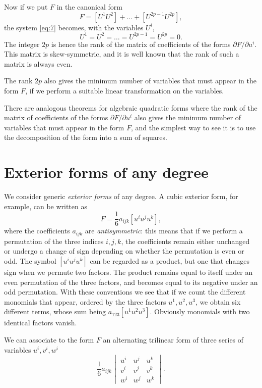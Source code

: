 \documentclass[leqno,11pt]{book}
\numberwithin{equation}{chapter}
\newcommand{\pd}{\partial}
\theoremstyle{shape1}
\theoremstyle{shape0}
\theoremstyle{shape2}
\theoremstyle{definition}
\begin{document}
Now if we put $F$ in the canonical form
\[
F=[U^{1}U^{2}]+\dots+[U^{2p-1}U^{2p}],
\]
the system \eqref{eq:7} becomes, with the variables $U^{i}$,
\[
U^{1}=U^{2}=\dots=U^{2p-1}=U^{2p}=0.
\]
The integer $2p$ is hence the rank of the matrix of coefficients of the forms $\pd F/\pd u^{i}$. This matrix is skew-symmetric, and it is well known that the rank of such a matrix is always even.

The rank $2p$ also gives the minimum number of variables that must appear in the form $F$, if we perform a suitable linear transformation on the variables.

There are analogous theorems for algebraic quadratic forms where the rank of the matrix of coefficients of the forms $\pd F/\pd u^{i}$ also gives the minimum number of variables that must appear in the form $F$, and the simplest way to see it is to use the decomposition of the form into a sum of squares.

\section{Exterior forms of any degree}
\label{sec:exter-forms-unsp}
\fsec We consider generic \emph{exterior forms} of any degree. A cubic exterior form, for example, can be written as
\begin{equation}
  \label{eq:8}
  F=\frac{1}{6}a_{ijk}[u^{i}u^{j}u^{k}],
\end{equation}
where the coefficients $a_{ijk}$ are \emph{antisymmetric}: this means that if we perform a permutation of the three indices $i,j,k$, the coefficients remain either unchanged or undergo a change of sign depending on whether the permutation is even or odd. The symbol $[u^{i}u^{j}u^{k}]$ can be regarded as a product, but one that changes sign when we permute two factors. The product remains equal to itself under an even permutation of the three factors, and becomes equal to its negative under an odd permutation. With these conventions we see that if we count the different monomials that appear, ordered by the three factors $u^{1},u^{2},u^{3}$, we obtain six different terms, whose sum being $a_{123}[u^{1}u^{2}u^{3}]$. Obviously monomials with two identical factors vanish.

We can associate to the form $F$ an alternating trilinear form of three series of variables $u^{i},v^{i},w^{i}$
\[
\frac{1}{6}a_{ijk}
\begin{vmatrix}
  u^{i}&u^{j}&u^{k}\\
  v^{i}&v^{j}&v^{k}\\
  w^{i}&w^{j}&w^{k}
\end{vmatrix}.
\]
\end{document}
